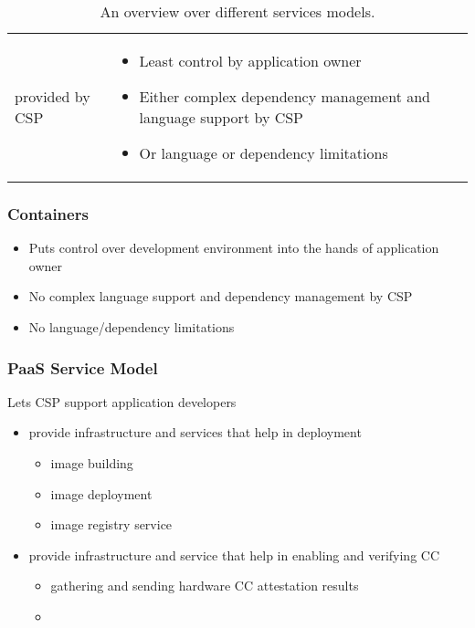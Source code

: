 \begin{table}
\begin{tabular}{L{75pt}|L{100pt}L{100pt}L{100pt}}
\begin{itemize}
            provided by CSP
    \end{itemize}  &
    \begin{itemize}
      \item Least control by application owner
      \item Either complex dependency management
            and language support by CSP
      \item Or language or dependency limitations
    \end{itemize}                                                                                                                                                       \\
  \end{tabular}
  \caption{An overview over different services models.}
  \label{table:1}
\end{table}

\subsubsection*{Containers}

\begin{itemize}
  \item Puts control over development environment into the hands of application
        owner
  \item No complex language support and dependency management by CSP
  \item No language/dependency limitations
\end{itemize}

\subsubsection*{PaaS Service Model}

Lets CSP support application developers
\begin{itemize}
  \item provide infrastructure and services that help in deployment
        \begin{itemize}
          \item image building
          \item image deployment
          \item image registry service
        \end{itemize}
  \item provide infrastructure and service that help in enabling and
        verifying CC
        \begin{itemize}
          \item gathering and sending hardware CC attestation results
          \item
        \end{itemize}
\end{itemize}

